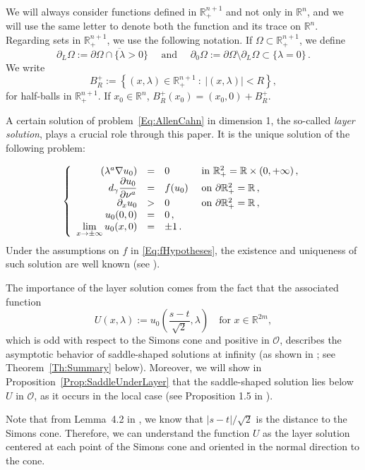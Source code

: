 \documentclass[12pt,reqno]{amsart}
\theoremstyle{definition}
\theoremstyle{remark}
\newcommand{\con}[1]{\mathbb{#1}}
\newcommand{\R}{\con{R}} %
\newcommand{\ocal}{\mathcal{O}}
\newcommand{\s}{\gamma}
\newcommand{\setcond}[2]{\left \{ #1 \ : \ #2  \right \}}
\newcommand\beqc[1]{\left\{\begin{array}{#1}}
\newcommand\eeqc{\end{array} \right.}
\def\PDEsystem{rcll}
\let\div\relax
\DeclareMathOperator{\div}{div}
\def\ds{\displaystyle}
\numberwithin{equation}{section}
\begin{document}
We will always consider functions defined in $\R^{n+1}_+$ and not only in $\R^n$, and we will use the same letter to denote both the function and its trace on $\R^n$. Regarding sets in $\R^{n+1}_+$, we use the following notation. If $\Omega \subset \R^{n+1}_+$, we define
$$
\partial_L \Omega := \overline{\partial \Omega \cap \{\lambda > 0\}}
 \quad \text{ and } \quad \partial_0 \Omega := \partial \Omega \setminus \partial_L \Omega \subset \{\lambda = 0\}\,.
$$
We write
$$
B_{R}^+ := \setcond{(x,\lambda)\in \R^{n+1}_+}{|(x,\lambda)|< R},
$$
for half-balls in $\R^{n+1}_+$. If $x_0\in \R^n$, $B_{R}^+(x_0)=(x_0,0)+B_{R}^+$.


A certain solution of problem~\eqref{Eq:AllenCahn} in dimension 1, the so-called \emph{layer solution}, plays a crucial role through this paper. It is the unique solution of the following problem:

\begin{equation}
\label{Eq:LayerSolution}
\beqc{\PDEsystem}
\div(\lambda^a \nabla u_0) &=& 0 & \textrm{ in } \R^{2}_+ = \R \times (0, +\infty)\,, \\
d_\s \dfrac{\partial u_0}{\partial \nu^a} &=& f(u_0) & \textrm{ on } \partial \R^{2}_+ = \R\,,\\
\partial_x u_0 &>& 0 & \textrm{ on } \partial \R^{2}_+ = \R\,,\\
u_0 (0,0) &=& 0 \,,\\
\ds \lim_{x\to\pm \infty} u_0 (x,0) &=& \pm 1\,.
\eeqc
\end{equation}
Under the assumptions on $f$ in \eqref{Eq:fHypotheses}, the existence and uniqueness of such solution are well known (see \cite{CabreSireI}).

The importance of the layer solution comes from the fact that the associated function
\begin{equation}
\label{Eq:DefULayer}
U(x,\lambda) := u_0\left( \frac{s-t}{\sqrt{2}},\lambda \right) \ \ \ \text{ for } x\in\R^{2m},
\end{equation}
which is odd with respect to the Simons cone and positive in $\ocal$, describes the asymptotic behavior of saddle-shaped solutions at infinity (as shown in \cite{Cinti-Saddle, Cinti-Saddle2}; see Theorem~\ref{Th:Summary} below). Moreover, we will show in Proposition~\ref{Prop:SaddleUnderLayer} that the saddle-shaped solution lies below $U$ in $\ocal$, as it occurs in the local case (see Proposition 1.5 in \cite{CabreTerraI}).

Note that from Lemma~4.2 in \cite{CabreTerraI}, we know that $|s-t|/\sqrt{2}$ is the distance to the Simons cone. Therefore, we can understand the function $U$ as the layer solution centered at each point of the Simons cone and oriented in the normal direction to the cone.
\end{document}
